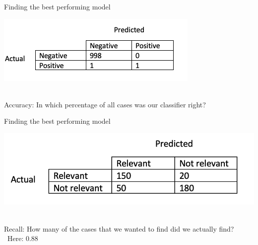 \documentclass[handout]{beamer}
\begin{document}
\begin{frame}{Finding the best performing model}

\begin{center}
	\includegraphics[width=\linewidth,height=\textheight,keepaspectratio]{../pictures/ConfusionMatrix1.png} \\\
\end{center}

Accuracy: In which percentage of all cases was our classifier right? 


\end{frame}



\begin{frame}{Finding the best performing model}
\begin{center}
	\includegraphics[width=\linewidth,height=\textheight,keepaspectratio]{../pictures/ConfusionMatrix2.png} \\\
\end{center}
	
Recall: How many of the cases that we wanted to find did we actually find? \\\
Here: 0.88
	
	
\end{frame}
\end{document}
